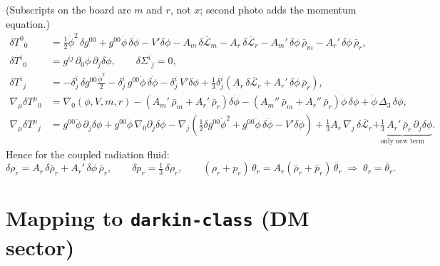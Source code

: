 \documentclass[11pt]{article}
\newcommand{\Lm}{\overline{\mathcal{L}}_{m}}
\newcommand{\Lr}{\overline{\mathcal{L}}_{r}}
\newcommand{\rhob}{\bar\rho}
\newcommand{\Am}{A_{m}}
\newcommand{\Ar}{A_{r}}
\begin{document}
(Subscripts on the board are $m$ and $r$, not $x$; second photo adds the
momentum equation.)
\begin{align}
\delta T^{0}{}_{0}
&= \tfrac12\dot{\phi}^2\,\delta g^{00}
   + g^{00}\dot{\phi}\,\delta\dot{\phi}
   - V'\delta\phi
   - \Am\,\delta\Lm - \Ar\,\delta\Lr
   - \Am'\,\delta\phi\,\rhob_{m}
   - \Ar'\,\delta\phi\,\rhob_{r},
\\[4pt]
\delta T^{i}{}_{0} &= g^{ij}\,\partial_0\phi\,\partial_j\delta\phi ,
\qquad \delta\Sigma^{i}{}_{j}=0 ,
\\[4pt]
\delta T^{i}{}_{j}
&= -\delta^{i}_{j}\,\delta g^{00}\tfrac{\dot\phi^{2}}{2}
   - \delta^{i}_{j}\,g^{00}\dot{\phi}\,\delta\dot{\phi}
   - \delta^{i}_{j}\,V'\delta\phi
   + \tfrac13\delta^{i}_{j}\left(\Ar\,\delta\Lr
   + \Ar'\,\delta\phi\,\rhob_{r}\right),
\\[4pt]
\nabla_{\mu}\delta T^{\mu}{}_{0}
&= \nabla_{0}\left(\phi, V, m, r\right)
   - \left(\Am'\,\rhob_m+\Ar'\,\rhob_r\right)\delta\dot{\phi}
   - \left(\Am''\,\rhob_m+\Ar''\,\rhob_r\right)\dot{\phi}\,\delta\phi
   + \dot{\phi}\,\Delta_3\,\delta\phi ,
\\[4pt]
\nabla_{\mu}\delta T^{\mu}{}_{j}
&= g^{00}\ddot\phi\,\partial_j\delta\phi
   + g^{00}\dot\phi\,\nabla_0\partial_j\delta\phi
   - \nabla_j\!\left(\tfrac12\delta g^{00}\dot\phi^2
   + g^{00}\dot\phi\,\delta\dot\phi - V'\delta\phi\right)
   + \tfrac13\Ar\,\nabla_j\,\delta\Lr
   \underbrace{+\tfrac13\,\Ar'\,\rhob_r\,\partial_j\delta\phi}_{\text{only new term}} .
\label{eq:boardEuler}
\end{align}
Hence for the coupled radiation fluid:
\begin{equation}
\delta\rho_r=\Ar\,\delta\rhob_r+\Ar'\,\delta\phi\,\rhob_r ,
\qquad
\delta p_r=\tfrac13\,\delta\rho_r ,
\qquad
(\rho_r+p_r)\,\theta_r=\Ar(\rhob_r+\bar p_r)\,\bar\theta_r
\;\Rightarrow\;\theta_r=\bar\theta_r .
\label{eq:deltarhor}
\end{equation}

\section{Mapping to \texttt{darkin-class} (DM sector)}
\end{document}
